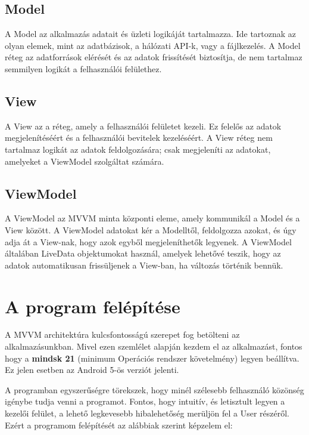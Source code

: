 \subsection{Model}

A Model az alkalmazás adatait és üzleti logikáját tartalmazza. Ide tartoznak az olyan elemek, mint az adatbázisok, a hálózati API-k, vagy a fájlkezelés. A Model réteg az adatforrások elérését és az adatok frissítését biztosítja, de nem tartalmaz semmilyen logikát a felhasználói felülethez.

\subsection{View}

A View az a réteg, amely a felhasználói felületet kezeli. Ez felelős az adatok megjelenítéséért és a felhasználói bevitelek kezeléséért. A View réteg nem tartalmaz logikát az adatok feldolgozására; csak megjeleníti az adatokat, amelyeket a ViewModel szolgáltat számára.

\subsection{ViewModel}

A ViewModel az MVVM minta központi eleme, amely kommunikál a Model és a View között. A ViewModel adatokat kér a Modelltől, feldolgozza azokat, és úgy adja át a View-nak, hogy azok egyből megjeleníthetők legyenek. A ViewModel általában LiveData objektumokat használ, amelyek lehetővé teszik, hogy az adatok automatikusan frissüljenek a View-ban, ha változás történik bennük.

\section{A program felépítése}

A MVVM architektúra kulcsfontosságú szerepet fog betölteni az alkalmazásunkban. Mivel ezen szemlélet alapján kezdem el az alkalmazást, fontos hogy a \textbf{mindsk 21} (minimum Operációs rendszer követelmény) legyen beállítva. Ez jelen esetben az Android 5-ös verziót jelenti. 

A programban egyszerűségre törekszek, hogy minél szélesebb felhasználó közönség igénybe tudja venni a programot. Fontos, hogy intuitív, és letisztult legyen a kezelői felület, a lehető legkevesebb hibalehetőség merüljön fel a User részéről. Ezért a programom felépítését az alábbiak szerint képzelem el:


